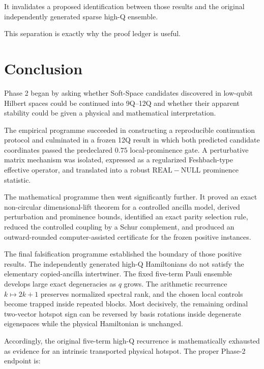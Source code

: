 \documentclass[11pt,a4paper]{article}
\newcommand{\Real}{\mathrm{REAL}}
\newcommand{\Null}{\mathrm{NULL}}
\begin{document}
It invalidates a proposed identification between those results and the
original independently generated sparse high-Q ensemble.

This separation is exactly why the proof ledger is useful.

\section{Conclusion}

Phase 2 began by asking whether Soft-Space candidates discovered in low-qubit
Hilbert spaces could be continued into 9Q--12Q and whether their apparent
stability could be given a physical and mathematical interpretation.

The empirical programme succeeded in constructing a reproducible continuation
protocol and culminated in a frozen 12Q result in which both predicted
candidate coordinates passed the predeclared \(0.75\) local-prominence gate.
A perturbative matrix mechanism was isolated, expressed as a regularized
Feshbach-type effective operator, and translated into a robust
\(\Real-\Null\) prominence statistic.

The mathematical programme then went significantly further.  It proved an
exact non-circular dimensional-lift theorem for a controlled ancilla model,
derived perturbation and prominence bounds, identified an exact parity
selection rule, reduced the controlled coupling by a Schur complement, and
produced an outward-rounded computer-assisted certificate for the frozen
positive instances.

The final falsification programme established the boundary of those positive
results.  The independently generated high-Q Hamiltonians do not satisfy the
elementary copied-ancilla intertwiner.  The fixed five-term Pauli ensemble
develops large exact degeneracies as \(q\) grows.  The arithmetic recurrence
\(k\mapsto2k+1\) preserves normalized spectral rank, and the chosen local
controls become trapped inside repeated blocks.  Most decisively, the
remaining ordinal two-vector hotspot sign can be reversed by basis rotations
inside degenerate eigenspaces while the physical Hamiltonian is unchanged.

Accordingly, the original five-term high-Q recurrence is mathematically
exhausted as evidence for an intrinsic transported physical hotspot.  The
proper Phase-2 endpoint is:
\end{document}
